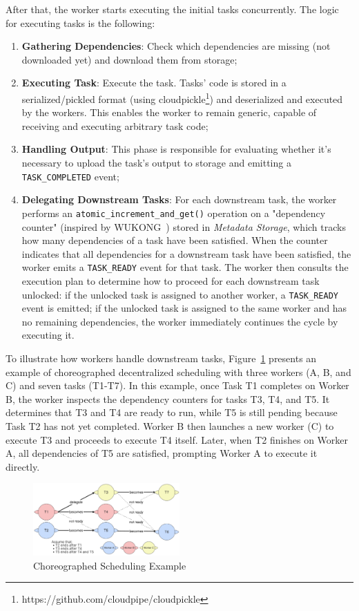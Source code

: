 \documentclass[conference]{IEEEtran}
\begin{document}
After that, the worker starts executing the initial tasks concurrently. The logic for executing tasks is the following:
\begin{enumerate}
    \item \textbf{Gathering Dependencies}: Check which dependencies are missing (not downloaded yet) and download them from storage;
    \item \textbf{Executing Task}: Execute the task. Tasks' code is stored in a serialized/pickled format (using cloudpickle\footnote{https://github.com/cloudpipe/cloudpickle}) and deserialized and executed by the workers. This enables the worker to remain generic, capable of receiving and executing arbitrary task code;
    \item \textbf{Handling Output}: This phase is responsible for evaluating whether it's necessary to upload the task's output to storage and emitting a \texttt{TASK\_COMPLETED} event;
    \item \textbf{Delegating Downstream Tasks}: For each downstream task, the worker performs an \texttt{atomic\_increment\_and\_get()} operation on a "dependency counter" (inspired by WUKONG~\cite{wukong_2}) stored in \textit{Metadata Storage}, which tracks how many dependencies of a task have been satisfied. When the counter indicates that all dependencies for a downstream task have been satisfied, the worker emits a \texttt{TASK\_READY} event for that task. The worker then consults the execution plan to determine how to proceed for each downstream task unlocked: if the unlocked task is assigned to another worker, a \texttt{TASK\_READY} event is emitted; if the unlocked task is assigned to the same worker and has no remaining dependencies, the worker immediately continues the cycle by executing it.
\end{enumerate}

To illustrate how workers handle downstream tasks, Figure~\ref{fig:choreographed_scheduling_example} presents an example of choreographed decentralized scheduling with three workers (A, B, and C) and seven tasks (T1-T7). In this example, once Task T1 completes on Worker B, the worker inspects the dependency counters for tasks T3, T4, and T5. It determines that T3 and T4 are ready to run, while T5 is still pending because Task T2 has not yet completed. Worker B then launches a new worker (C) to execute T3 and proceeds to execute T4 itself. Later, when T2 finishes on Worker A, all dependencies of T5 are satisfied, prompting Worker A to execute it directly.

\begin{figure}[h]
    \centering
    \includegraphics[width=0.5\textwidth]{figures/choreographed_execution_example.png}
    \caption{Choreographed Scheduling Example}
    \label{fig:choreographed_scheduling_example}
\end{figure}
\end{document}

